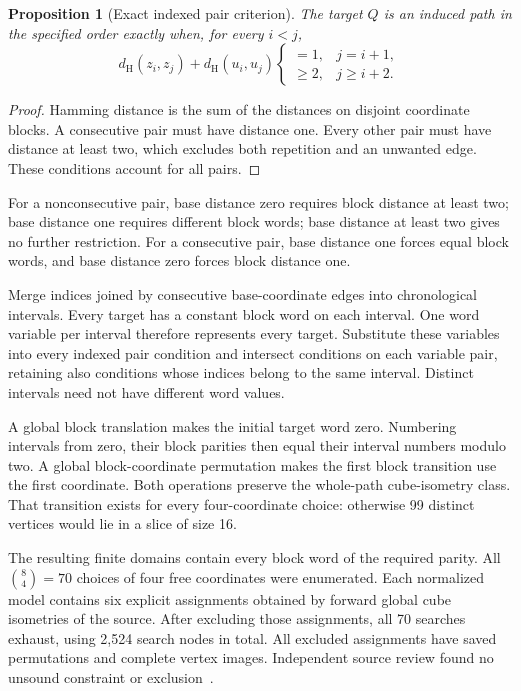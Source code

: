 \documentclass[11pt,a4paper]{article}
\newtheorem{proposition}[theorem]{Proposition}
\theoremstyle{definition}
\theoremstyle{remark}
\newcommand{\Ham}{d_{\mathrm H}}
\begin{document}
\begin{proposition}[Exact indexed pair criterion]
The target $Q$ is an induced path in the specified order exactly
when, for every $i<j$,
\[
\Ham(z_i,z_j)+\Ham(u_i,u_j)
\begin{cases}
=1,&j=i+1,\\
\ge2,&j\ge i+2.
\end{cases}
\]
\end{proposition}
\begin{proof}
Hamming distance is the sum of the distances on disjoint coordinate
blocks. A consecutive pair must have distance one. Every other pair
must have distance at least two, which excludes both repetition and
an unwanted edge. These conditions account for all pairs.
\end{proof}

For a nonconsecutive pair, base distance zero requires block
distance at least two; base distance one requires different block
words; base distance at least two gives no further restriction.
For a consecutive pair, base distance one forces equal block words,
and base distance zero forces block distance one.

Merge indices joined by consecutive base-coordinate edges into
chronological intervals. Every target has a constant block word on
each interval. One word variable per interval therefore represents
every target. Substitute these variables into every indexed pair
condition and intersect conditions on each variable pair, retaining
also conditions whose indices belong to the same interval. Distinct
intervals need not have different word values.

A global block translation makes the initial target word zero.
Numbering intervals from zero, their block parities then equal
their interval numbers modulo two. A global block-coordinate
permutation makes the first block transition use the first coordinate.
Both operations preserve the whole-path cube-isometry class.
That transition exists for every four-coordinate choice: otherwise
99 distinct vertices would lie in a slice of size 16.

The resulting finite domains contain every block word of the
required parity. All $\binom84=70$ choices of four free coordinates
were enumerated. Each normalized model contains six explicit
assignments obtained by forward global cube isometries of the source.
After excluding those assignments, all 70 searches exhaust, using
2,524 search nodes in total. All excluded assignments have saved
permutations and complete vertex images. Independent source review
found no unsound constraint or exclusion~\cite{research206}.
\end{document}
